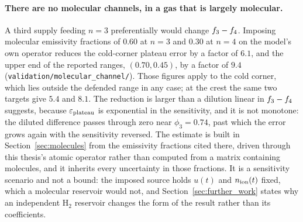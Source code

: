 \paragraph{There are no molecular channels, in a gas that is largely
molecular.} A third supply feeding $n=3$ preferentially would change
$f_{3}-f_{4}$. Imposing molecular emissivity fractions of $0.60$ at
$n=3$ and $0.30$ at $n=4$ on the model's own operator reduces the cold-corner
plateau error by a factor of $6.1$, and the upper end of the reported ranges,
$(0.70,0.45)$, by a factor of $9.4$
(\texttt{validation/molecular\_channel/}). Those figures apply to the cold
corner, which lies outside the defended range in any case; at the crest the
same two targets give $5.4$ and $8.1$. The reduction is larger than a dilution
linear in $f_{3}-f_{4}$ suggests, because $\varepsilon_{\mathrm{plateau}}$ is exponential in
the sensitivity, and it is not monotone: the diluted difference passes through
zero near $\phi_3 = 0.74$, past which the error grows again with the
sensitivity reversed.
The estimate is built in Section~\ref{sec:molecules} from the emissivity
fractions cited there, driven through this thesis's atomic operator rather than
computed from a matrix containing molecules, and it
inherits every uncertainty in those fractions. It is a sensitivity scenario and
not a bound: the imposed source holds $u(t)$ and $n_{\mathrm{ion}}(t)$ fixed, which a
molecular reservoir would not, and Section~\ref{sec:further_work} states why an
independent $\mathrm{H_2}$ reservoir changes the form of the result rather than
its coefficients.

